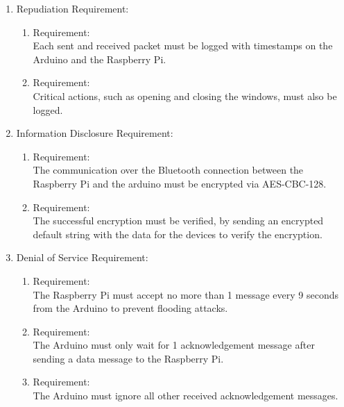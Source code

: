 \begin{enumerate}[label*=\arabic*.]
        \item \label{sreq.3} Repudiation Requirement:  \\
        \begin{enumerate}[label*=\arabic*.]
			\item \label{req.6.3.1}  Requirement:  \\
            Each sent and received packet must be logged with timestamps on the Arduino and the Raspberry Pi. \\ 
			\item \label{req.6.3.2}  Requirement:  \\
            Critical actions, such as opening and closing the windows, must also be logged.\\
	  \end{enumerate}

        \item \label{sreq.4} Information Disclosure Requirement:  \\
        \begin{enumerate}[label*=\arabic*.]
			\item \label{req.6.4.1}  Requirement:  \\
            The communication over the Bluetooth connection between the Raspberry Pi and the arduino must be encrypted via AES-CBC-128. \\ 
			\item \label{req.6.4.2}  Requirement:  \\
            The successful encryption must be verified, by sending an encrypted default string with the data for the devices to verify the encryption.\\
	  \end{enumerate}

        
        \item \label{sreq.5} Denial of Service Requirement:  \\
        \begin{enumerate}[label*=\arabic*.]
			\item \label{req.6.5.1}  Requirement:  \\
            The Raspberry Pi must accept no more than 1 message every 9 seconds from the Arduino to prevent flooding attacks. \\
			\item \label{req.6.5.2}  Requirement:  \\
            The Arduino must only wait for 1 acknowledgement message after sending a data message to the Raspberry Pi.\\
            \item \label{req.6.5.3}  Requirement:  \\
            The Arduino must ignore all other received acknowledgement messages.\\
	  \end{enumerate}


\end{enumerate}
